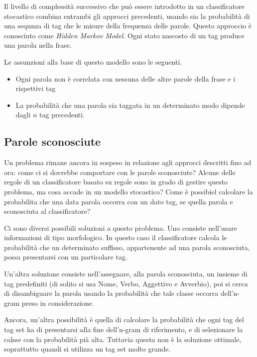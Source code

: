 Il livello di complessit\`a successivo che pu\`o essere introdotto in un classificatore stocastico combina entrambi gli approcci precedenti, usando sia la probabilit\`a di una sequnza di tag che le misure della frequenza delle parole.
Questo approccio \`e conosciuto come \emph{Hidden Markov Model}.
Ogni stato nascosto di un tag produce una parola nella frase.

Le assunzioni alla base di questo modello sono le seguenti.

\begin{itemize}
  \item Ogni parola non \`e correlata con nessuna delle altre parole della frase e i rispettivi tag
  \item La probabilit\`a che una parola sia taggata in un determinato modo dipende dagli $n$ tag precedenti.
\end{itemize}

\subsection{Parole sconosciute}

Un problema rimane ancora in sospeso in relazione agli approcci descritti fino ad ora: come ci si dovrebbe comportare con le parole sconosciute?
Alcune delle regole di un classificatore basato su regole sono in grado di gestire questo problema, ma cosa accade in un modello stocastico?
Come \`e possibiel calcolare la probabilita che una data parola occorra con un dato tag, se quella parola e sconosciuta al classificatore?

Ci sono diversi possibili soluzioni a questo problema.
Uno consiste nell'usare informazioni di tipo morfologico.
In questo caso il classificatore calcola le probabilit\`a che un determinato suffisso, appartenente ad una parola sconosciuta, possa presentarsi con un particolare tag.

Un'altra soluzione consiste nell'assegnare, alla parola sconosciuta, un insieme di tag predefiniti (di solito si usa Nome, Verbo, Aggettivo e Avverbio), poi si cerca di disambiguare la parola usando la probabilit\`a che tale classe occorra dell'n-gram preso in considerazione.

Ancora, un'altra possibilit\`a \`e quella di calcolare la probabilit\`a che ogni tag del tag set ha di presentarsi alla fine dell'n-gram di riferimento, e di selezionare la calsse con la probabilit\`a pi\`a alta.
Tuttavia questa non \`e la soluzione ottimale, soprattutto quandi si utilizza un tag set molto grande.

